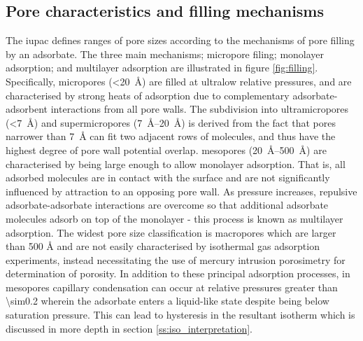 \subsection{Pore characteristics and filling mechanisms}
\label{ss:pore_filling}

The \acrfull{iupac} defines ranges of pore sizes according to the mechanisms of pore filling by an \gls{adsorbate}.\citep{Thommes2015Physisorption} The three main mechanisms; \gls{micropore} filing; monolayer adsorption; and multilayer adsorption are illustrated in figure \ref{fig:filling}. Specifically, \glspl{micropore} (\qty{<20}{\angstrom})\citep{mcnaught1997compendium} are filled at ultralow relative pressures, and are characterised by strong heats of adsorption due to complementary \gls{adsorbate}-\gls{adsorbent} interactions from all pore walls.\citep{dubinin1989fundamentals} The subdivision into \glspl{ultramicropore} (\qty{<7}{\angstrom}) and \glspl{supermicropore} (\qtyrange[range-units=single]{7}{20}{\angstrom})\citep{mcnaught1997compendium} is derived from the fact that pores narrower than \qty{7}{\angstrom} can fit two adjacent rows of  molecules,\citep{Thommes2015Physisorption} and thus have the highest degree of pore wall potential overlap. \Glspl{mesopore} (\qtyrange[range-units=single]{20}{500}{\angstrom})\citep{mcnaught1997compendium} are characterised by being large enough to allow monolayer adsorption. That is, all adsorbed molecules are in contact with the surface and are not significantly influenced by attraction to an opposing pore wall.\citep{gregg1967adsorption, yang1997gas} As pressure increases, repulsive \gls{adsorbate}-\gls{adsorbate} interactions are overcome so that additional \gls{adsorbate} molecules adsorb on top of the monolayer - this process is known as multilayer adsorption. The widest pore size classification is \glspl{macropore} which are larger than 500 \unit{\angstrom}\citep{mcnaught1997compendium} and are not easily characterised by isothermal gas adsorption experiments, instead necessitating the use of mercury intrusion porosimetry for determination of porosity.\citep{abell1999mercury, gregg1967adsorption, haynes1973pore} In addition to these principal adsorption processes, in \glspl{mesopore} capillary condensation can occur at relative pressures greater than \num{\sim0.2} wherein the adsorbate enters a liquid-like state despite being below saturation pressure. This can lead to hysteresis in the resultant isotherm which is discussed in more depth in section \ref{ss:iso_interpretation}.\citep{Thommes2015Physisorption, monson2012understanding}

